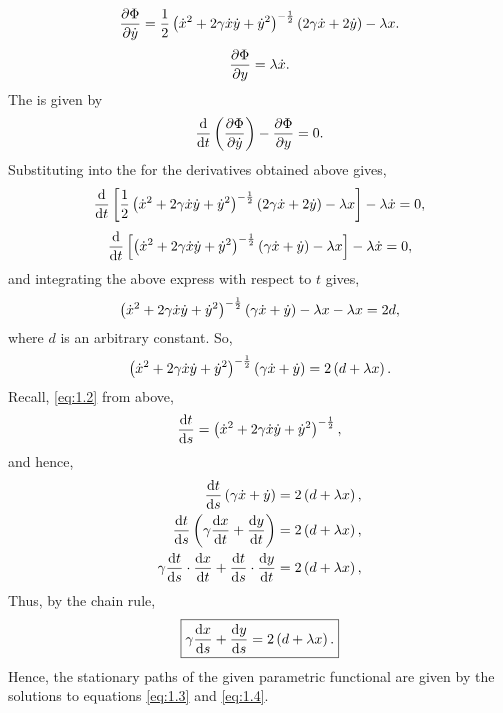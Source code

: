 \[
	\frac{\partial \Phi}{\partial \dot{y}} = \frac{1}{2}\left(\dot{x}^2 + 2\gamma\dot{x}\dot{y} + \dot{y}^2\right)^{-\frac{1}{2}}\left(2\gamma\dot{x} + 2\dot{y}\right) - \lambda x.
\]
\[
	\frac{\partial \Phi}{\partial y} = \lambda\dot{x}.
\]
The \el is given by
\[
	\frac{\mathrm{d}}{\mathrm{d}t}\left(\frac{\partial \Phi}{\partial \dot{y}}\right)-\frac{\partial \Phi}{\partial y} = 0.
\]
Substituting into the \el for the derivatives obtained above gives,
\[
	\frac{\mathrm{d}}{\mathrm{d}t}\left[\frac{1}{2}\left(\dot{x}^2 + 2\gamma\dot{x}\dot{y} + \dot{y}^2\right)^{-\frac{1}{2}}\left(2\gamma\dot{x} + 2\dot{y}\right) - \lambda x\right] - \lambda \dot{x} = 0,
\]
\[
	\frac{\mathrm{d}}{\mathrm{d}t}\left[\left(\dot{x}^2 + 2\gamma\dot{x}\dot{y} + \dot{y}^2\right)^{-\frac{1}{2}}\left(\gamma\dot{x} + \dot{y}\right) - \lambda x\right] - \lambda \dot{x} = 0,
\]
and integrating the above express with respect to $t$ gives,
\[
	\left(\dot{x}^2 + 2\gamma\dot{x}\dot{y} + \dot{y}^2\right)^{-\frac{1}{2}}\left(\gamma\dot{x} + \dot{y}\right) - \lambda x - \lambda x = 2d,
\]
where $d$ is an arbitrary constant. So,
\begin{equation*}
	\left(\dot{x}^2 + 2\gamma\dot{x}\dot{y} + \dot{y}^2\right)^{-\frac{1}{2}}\left(\gamma\dot{x} + \dot{y}\right) = 2\left(d + \lambda x\right).
\end{equation*}
Recall, \eqref{eq:1.2} from above,
\begin{equation*}
	\frac{\mathrm{d}t}{\mathrm{d}s} = \left(\dot{x}^2 + 2\gamma\dot{x}\dot{y} + \dot{y}^2\right)^{-\frac{1}{2}},
\end{equation*}
and hence,
\begin{align*}
	\frac{\mathrm{d}t}{\mathrm{d}s}\left(\gamma\dot{x} + \dot{y}\right) = 2\left(d + \lambda x\right),\\
	\frac{\mathrm{d}t}{\mathrm{d}s}\left(\gamma\frac{\mathrm{d}x}{\mathrm{d}t} +\frac{\mathrm{d}y}{\mathrm{d}t}\right) = 2\left(d+\lambda x\right),\\
	\gamma\frac{\mathrm{d}t}{\mathrm{d}s}\cdot\frac{\mathrm{d}x}{\mathrm{d}t} + \frac{\mathrm{d}t}{\mathrm{d}s}\cdot\frac{\mathrm{d}y}{\mathrm{d}t} = 2\left(d+\lambda x\right),\\
\end{align*}
Thus, by the chain rule,
\begin{equation}
	\label{eq:1.4}
	\boxed{\gamma\frac{\mathrm{d}x}{\mathrm{d}s} + \frac{\mathrm{d}y}{\mathrm{d}s} = 2\left(d + \lambda x\right).}
\end{equation}
Hence, the stationary paths of the given parametric functional are given by the solutions to equations \eqref{eq:1.3} and \eqref{eq:1.4}.